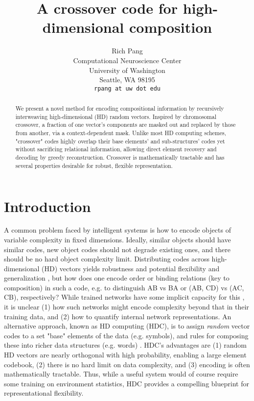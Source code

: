 \documentclass{article}
\title{A crossover code for high-dimensional composition}
\author{%
  Rich Pang\\
  Computational Neuroscience Center\\
  University of Washington\\
  Seattle, WA 98195\\
  \texttt{rpang at uw dot edu} \\
}
\begin{document}
\maketitle

\begin{abstract}
We present a novel method for encoding compositional information by recursively interweaving high-dimensional (HD) random vectors. Inspired by chromosomal crossover, a fraction of one vector's components are masked out and replaced by those from another, via a context-dependent mask. Unlike most HD computing schemes, "crossover" codes highly overlap their base elements' and sub-structures' codes yet without sacrificing relational information, allowing direct element recovery and decoding by greedy reconstruction. Crossover is mathematically tractable and has several properties desirable for robust, flexible representation.
\end{abstract}

\section{Introduction}

A common problem faced by intelligent systems is how to encode objects of variable complexity in fixed dimensions. Ideally, similar objects should have similar codes, new object codes should not degrade existing ones, and there should be no hard object complexity limit. Distributing codes across high-dimensional (HD) vectors yields robustness and potential flexibility and generalization \cite{Hinton:1984, Mikolov:2013}, but how does one encode order or binding relations (key to composition) in such a code, e.g. to distinguish AB vs BA or (AB, CD) vs (AC, CB), respectively? While trained networks have some implicit capacity for this \cite{language network}, it is unclear (1) how such networks might encode complexity beyond that in their training data, and (2) how to quantify internal network representations. An alternative approach, known as HD computing (HDC), is to assign \textit{random} vector codes to a set "base" elements of the data (e.g. symbols), and rules for composing these into richer data structures (e.g. words) \cite{Plate, Kanerva, Gayler}. HDC's advantages are (1) random HD vectors are nearly orthogonal with high probability, enabling a large element codebook, (2) there is no hard limit on data complexity, and (3) encoding is often mathematically tractable. Thus, while a useful system would of course require some training on environment statistics, HDC provides a compelling blueprint for representational flexibility.
\end{document}
